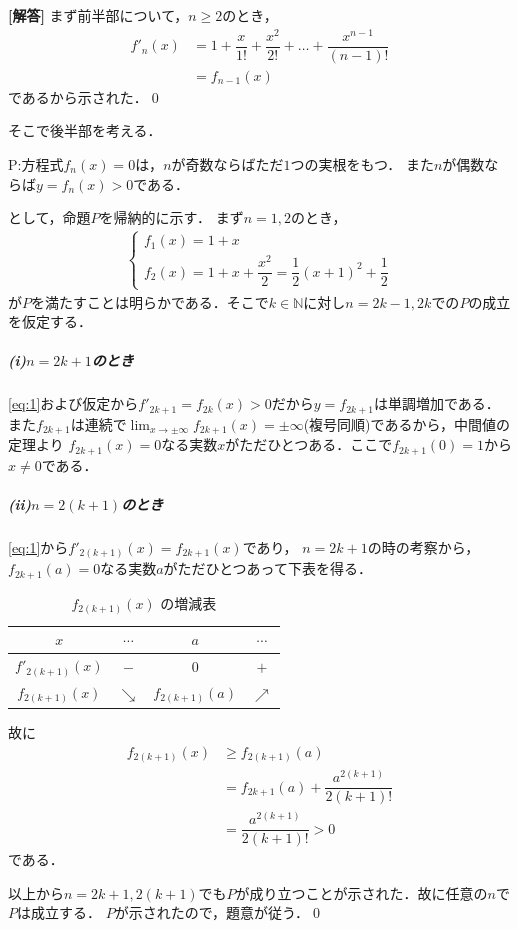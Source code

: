 \documentclass[../../main.tex]{subfiles}
\begin{document}
\begin{oframed}
  
\end{oframed}

{\bf [解答]} まず前半部について，$n\ge2$のとき，
\begin{align}
  f'_n(x)&=1+\dfrac{x}{1!}+\dfrac{x^2}{2!}+\dots+\dfrac{x^{n-1}}{(n-1)!}\nonumber \\
  &=f_{n-1}(x) \label{eq:1}
\end{align}
であるから示された．\qed

そこで後半部を考える．
\begin{center}
  P:方程式$f_n(x)=0$は，$n$が奇数ならばただ$1$つの実根をもつ．
  また$n$が偶数ならば$y=f_n(x)>0$である．
\end{center}
として，命題$P$を帰納的に示す．
まず$n=1,2$のとき，
\begin{align}
  \left\{
    \begin{array}{l}
      f_1(x)=1+x \\
      f_2(x)=1+x+\dfrac{x^2}{2}=\dfrac{1}{2}(x+1)^2+\dfrac{1}{2}
    \end{array}
    \right.
  \end{align}
  が$P$を満たすことは明らかである．そこで$k\in\mathbb{N}$に対し$n=2k-1,2k$での$P$の成立を仮定する．

  \subparagraph{(i)$n=2k+1$のとき}

  \cref{eq:1}および仮定から$f'_{2k+1}=f_{2k}(x)>0$だから$y=f_{2k+1}$は単調増加である．
  また$f_{2k+1}$は連続で$\lim_{x\to\pm\infty}f_{2k+1}(x)=\pm\infty$(複号同順)であるから，中間値の定理より
  $f_{2k+1}(x)=0$なる実数$x$がただひとつある．ここで$f_{2k+1}(0)=1$から$x\not=0$である．

  \subparagraph{(ii)$n=2(k+1)$のとき}

  \cref{eq:1}から$f'_{2(k+1)}(x)=f_{2k+1}(x)$であり，
  $n=2k+1$の時の考察から，$f_{2k+1}(a)=0$なる実数$a$がただひとつあって下表を得る．

  \begin{table}[htb]
    \centering
    \caption{$f_{2(k+1)}(x)$ の増減表}
    \label{tab:f_2k_plus_2}
    \begin{tabular}{|c|c|c|c|}
      \hline
      $x$ & $\cdots$ & $a$ & $\cdots$ \\ \hline
      $f'_{2(k+1)}(x)$ & $-$ & $0$ & $+$ \\ \hline
      $f_{2(k+1)}(x)$ & $\searrow$ & $f_{2(k+1)}(a)$ & $\nearrow$ \\ \hline
    \end{tabular}
  \end{table}
  故に
  \begin{align}
    f_{2(k+1)}(x)&\ge f_{2(k+1)}(a) \\
    &= f_{2k+1}(a)+\dfrac{a^{2(k+1)}}{2(k+1)!}   \\
    &=\dfrac{a^{2(k+1)}}{2(k+1)!}
    >0
  \end{align}
  である．
  \casesend

  以上から$n=2k+1,2(k+1)$でも$P$が成り立つことが示された．故に任意の$n$で$P$は成立する．
  $P$が示されたので，題意が従う．\qed

  \newpage
  
\end{document}
